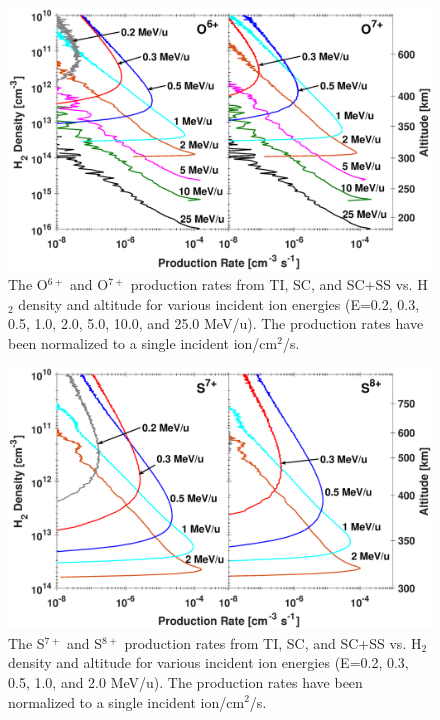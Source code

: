 \documentclass[draft]{agujournal2018}
\begin{document}
\begin{figure}[ht]
    \centering
    \includegraphics[width=\textwidth]{Figures/O6O7CXProd.eps}
    \caption{The O$^{6+}$ and O$^{7+}$ production rates from TI, SC, and SC+SS vs. H$_2$ density and altitude for various incident ion energies (E=0.2, 0.3, 0.5, 1.0, 2.0, 5.0, 10.0, and 25.0 MeV/u). The production rates have been normalized to a single incident ion/cm$^2$/s.}
    \label{fig:O6O7+Prod}
\end{figure}

\begin{figure}[ht]
    \centering
    \includegraphics[width=\textwidth]{Figures/S7S8CXProd.eps}
    \caption{The S$^{7+}$ and S$^{8+}$ production rates from TI, SC, and SC+SS vs. H$_2$ density and altitude for various incident ion energies (E=0.2, 0.3, 0.5, 1.0, and 2.0 MeV/u). The production rates have been normalized to a single incident ion/cm$^2$/s.}
    \label{fig:S7S8+Prod}
\end{figure}
\end{document}
